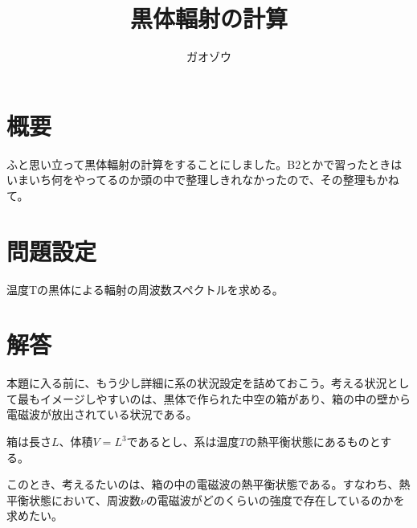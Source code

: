 \documentclass[uplatex,dvipdfmx]{jsarticle}
\title{黒体輻射の計算}
\author{ガオゾウ}
\begin{document}
\maketitle
\section{概要}
ふと思い立って黒体輻射の計算をすることにしました。B2とかで習ったときはいまいち何をやってるのか頭の中で整理しきれなかったので、その整理もかねて。

\section{問題設定}
温度Tの黒体による輻射の周波数スペクトルを求める。
\section{解答}
本題に入る前に、もう少し詳細に系の状況設定を詰めておこう。考える状況として最もイメージしやすいのは、黒体で作られた中空の箱があり、箱の中の壁から電磁波が放出されている状況である。

箱は長さ$L$、体積$V=L^3$であるとし、系は温度$T$の熱平衡状態にあるものとする。

このとき、考えるたいのは、箱の中の電磁波の熱平衡状態である。すなわち、熱平衡状態において、周波数$\nu$の電磁波がどのくらいの強度で存在しているのかを求めたい。
\end{document}
